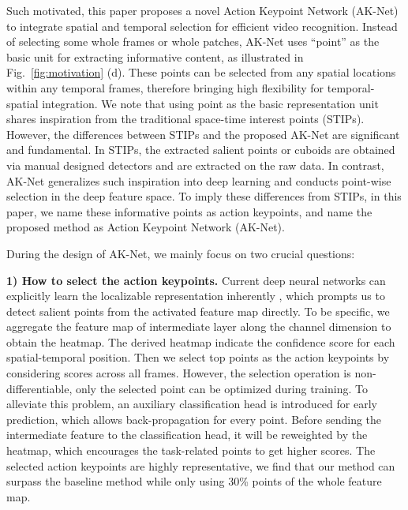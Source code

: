 \documentclass[journal]{IEEEtran}
\begin{document}
Such motivated, this paper proposes a novel Action Keypoint Network (AK-Net) to integrate spatial and temporal selection for efficient video recognition. Instead of selecting some whole frames or whole patches, AK-Net uses ``point'' as the basic unit for extracting informative content, as illustrated in Fig.~\ref{fig:motivation} (d). These points can be selected from any spatial locations within any temporal frames, therefore bringing high flexibility for temporal-spatial integration. 
We note that using point as the basic representation unit shares inspiration from the traditional space-time interest points (STIPs). However, the differences between STIPs and the proposed AK-Net are significant and fundamental. In STIPs, the extracted salient points \cite{bregonzio2009recognising} or cuboids \cite{dollar2005behavior} are obtained via manual designed detectors and are extracted on the raw data. In contrast, AK-Net generalizes such inspiration into deep learning and conducts point-wise selection in the deep feature space. To imply these differences from STIPs, in this paper, we name these informative points as action keypoints, and name the proposed method as Action Keypoint Network (AK-Net). 

During the design of AK-Net, we mainly focus on two crucial questions:

\textbf{1) How to select the action keypoints.}
Current deep neural networks can explicitly learn the localizable representation inherently \cite{zhou2016learning, selvaraju2017grad}, which prompts us to detect salient points from the activated feature map directly.
To be specific, we aggregate the feature map of intermediate layer along the channel dimension to obtain the heatmap.
The derived heatmap indicate the confidence score for each spatial-temporal position.
Then we select top  points as the action keypoints by considering scores across all frames.
However, the selection operation is non-differentiable, only the selected point can be optimized during training.
To alleviate this problem, an auxiliary classification head is introduced for early prediction, which allows back-propagation for every point.
Before sending the intermediate feature to the classification head, it will be reweighted by the heatmap, which encourages the task-related points to get higher scores.
The selected action keypoints are highly representative, we find that our method can surpass the baseline method while only using 30\% points of the whole feature map.
\end{document}
